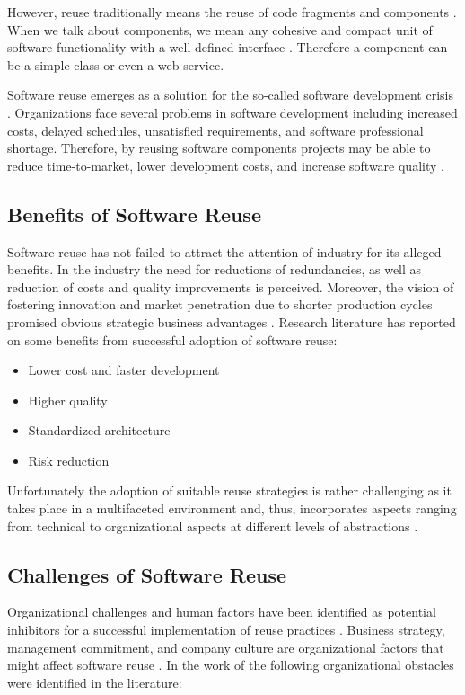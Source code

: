 However, reuse traditionally means the reuse of code fragments and components \cite{Mili2002}. When we talk about components, we mean any cohesive and compact unit of software functionality with a well defined interface \cite{Hummel2008}. Therefore a component can be a simple class or even a web-service.

Software reuse emerges as a solution for the so-called software development crisis \cite{Kim1992}. Organizations face several problems in software development including increased costs, delayed schedules, unsatisfied requirements, and software professional shortage. Therefore, by reusing software components projects may be able to reduce time-to-market, lower development costs, and increase software quality \cite{Frakes2005}.

\subsection{Benefits of Software Reuse}
Software reuse has not failed to attract the attention of industry for its alleged benefits. In the industry the need for reductions of redundancies, as well as reduction of costs and quality improvements is perceived. Moreover, the vision of fostering innovation and market penetration due to shorter production cycles promised obvious strategic business advantages \cite{Bauer2016}. Research literature has reported on some benefits from successful adoption of software reuse:

\begin{itemize}
\item Lower cost and faster development
\item Higher quality
\item Standardized architecture
\item Risk reduction
\end{itemize}

Unfortunately the adoption of suitable reuse strategies is rather challenging as it takes place in a multifaceted environment and, thus, incorporates aspects ranging from technical to organizational aspects at different levels of abstractions \cite{Bauer2016}.

\subsection{Challenges of Software Reuse}
\label{sec:sw-challenges}
Organizational challenges and human factors have been identified as potential inhibitors for a successful implementation of reuse practices \cite{Morisio2002}. Business strategy, management commitment, and company culture are organizational factors that might affect software reuse \cite{Standish1984}. In the work of \citeauthor{Bauer2016}\cite{Bauer2016} the following organizational obstacles were identified in the literature:

